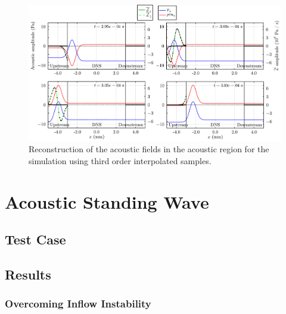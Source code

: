\begin{figure}[t]
\centering
\includegraphics[scale=0.35]{assets/graphs/ac_frames.pdf}
\caption{Reconstruction of the acoustic fields in the acoustic region for the simulation using third order interpolated samples.}
\label{fig:ac-reconstruct_order3}
\end{figure}





\section{Acoustic Standing Wave}

\subsection{Test Case}




\subsection{Results}

\subsubsection{Overcoming Inflow Instability}

